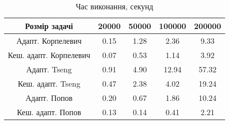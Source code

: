 \begin{table}[H]
	\centering
	\begin{tabular}{|c||c|c|c|c|}\hline
		Розмір задачі & 20000 & 50000 & 100000 & 200000 \\ \hline \hline
		Адапт. Корпелевич & 0.15 & 1.28 & 2.36 & 9.33 \\ \hline
		Кеш. адапт. Корпелевич & 0.07 & 0.53 & 1.14 & 3.92 \\ \hline
		Адапт. Tseng & 0.91 & 4.90 & 12.94 & 57.32 \\ \hline
		Кеш. адапт. Tseng & 0.47 & 2.38 & 4.02 & 19.24 \\ \hline
		Адапт. Попов & 0.20 & 0.67 & 1.86 & 10.24 \\ \hline
		Кеш. адапт. Попов & 0.13 & 0.14 & 0.41 & 2.21 \\ \hline
	\end{tabular}
	\caption{Час виконання, секунд}
\end{table}
